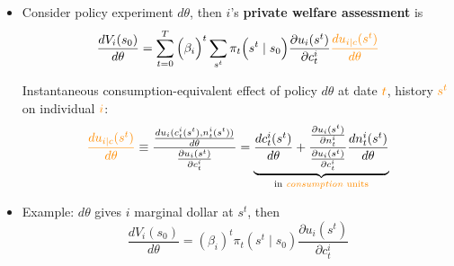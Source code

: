 \documentclass[11pt, aspectratio=169]{beamer}
\begin{document}
\begin{frame}{}
\begin{itemize}
\item Consider policy experiment $d \theta$, then $i$'s \textbf{private welfare assessment} is
\begin{align*}
	\frac{ d V_i(s_0) }{d \theta} = \sum_{t=0}^T \Big( \beta_i \Big)^t \sum_{s^t} \pi_t \Big( s^t \mid s_0 \Big)  \frac{\partial u_i (s^t)}{\partial c_t^i}  {\color{myorange} \frac{ d u_{i \mid c} (s^t)}{d \theta}}
\end{align*}

\vspace{4mm}
{\color{myorange} Instantaneous consumption-equivalent effect} of policy $d \theta$ at date ${\color{myorange} t}$, history ${\color{myorange} s^t}$ on individual ${\color{myorange} i}$:
\vspace*{0mm}
\begin{align*}
	{\color{myorange} \frac{ d u_{i \mid c} (s^t)}{d \theta}} \equiv \frac{ \frac{d u_i (c_t^i(s^t), n_t^i(s^t))}{d \theta} }{ \frac{\partial u_i (s^t)}{\partial c_t^i}}  = \underbrace{ \frac{d c_t^i (s^t)}{d \theta} + \frac{ \frac{\partial u_i (s^t)}{\partial n_t^i} }{ \frac{\partial u_i (s^t)}{\partial c_t^i}}  \frac{d n_t^i (s^t)}{d \theta} }_\text{in {\color{myorange} \textit{consumption} units}}
\end{align*}

\item Example: $d \theta$ gives $i$ marginal dollar at $s^t$, then
\begin{equation*}
	\frac{dV_i(s_0)}{d \theta} = (\beta_i)^t \pi_t(s^t \mid s_0) \frac{\partial u_i(s^t)}{\partial c_t^i}
\end{equation*}
\end{itemize}
\end{frame}
\end{document}
